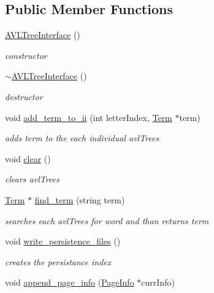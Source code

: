 \subsection*{Public Member Functions}
\begin{DoxyCompactItemize}
\item 
\hyperlink{class_a_v_l_tree_interface_abaec1061e3c1982382aeda27495af568}{A\+V\+L\+Tree\+Interface} ()
\begin{DoxyCompactList}\small\item\em constructor \end{DoxyCompactList}\item 
\hyperlink{class_a_v_l_tree_interface_a919ac950421b6702b2f82b9849b81108}{$\sim$\+A\+V\+L\+Tree\+Interface} ()
\begin{DoxyCompactList}\small\item\em destructor \end{DoxyCompactList}\item 
void \hyperlink{class_a_v_l_tree_interface_a2ff7466f1fd70ce6391330c04749fec7}{add\+\_\+term\+\_\+to\+\_\+ii} (int letter\+Index, \hyperlink{class_term}{Term} $\ast$term)
\begin{DoxyCompactList}\small\item\em adds term to the each individual avl\+Trees \end{DoxyCompactList}\item 
void \hyperlink{class_a_v_l_tree_interface_a748ffc895fb64aab3e2afac287f80630}{clear} ()
\begin{DoxyCompactList}\small\item\em clears avl\+Trees \end{DoxyCompactList}\item 
\hyperlink{class_term}{Term} $\ast$ \hyperlink{class_a_v_l_tree_interface_a35ee941b125e65cf0b5783a687503d83}{find\+\_\+term} (string term)
\begin{DoxyCompactList}\small\item\em searches each avl\+Trees for word and than returns term \end{DoxyCompactList}\item 
void \hyperlink{class_a_v_l_tree_interface_abd7f70746611a3982dc07a1b1880e7b5}{write\+\_\+persistence\+\_\+files} ()
\begin{DoxyCompactList}\small\item\em creates the persistance index \end{DoxyCompactList}\item 
void \hyperlink{class_index_interface_a7f082789ce91eaaacc10a5c841b62cd4}{append\+\_\+page\+\_\+info} (\hyperlink{class_page_info}{Page\+Info} $\ast$curr\+Info)

\end{DoxyCompactItemize}
